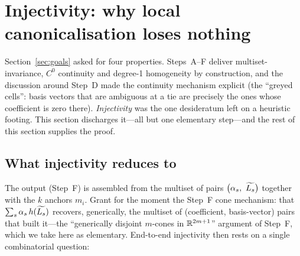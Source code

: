 %

\section{Injectivity: why local canonicalisation loses nothing}
\label{sec:bridge}

Section~\ref{sec:goals} asked for four properties.  Steps~A--F deliver
multiset-invariance, $C^0$ continuity and degree-1 homogeneity by construction,
and the discussion around Step~D made the continuity mechanism explicit (the
``greyed cells'': basis vectors that are ambiguous at a tie are precisely the
ones whose coefficient is zero there).  \emph{Injectivity} was the one
desideratum left on a heuristic footing.  This section discharges it---all but
one elementary step---and the rest of this section supplies the proof.

\subsection*{What injectivity reduces to}

The output (Step~F) is assembled from the multiset of pairs
$\bigl(\alpha_s,\ \widetilde{L_s}\bigr)$ together with the $k$ anchors $m_i$.  Grant
for the moment the Step~F cone mechanism: that $\sum_s\alpha_s\,h(\widetilde{L_s})$
recovers, generically, the multiset of (coefficient, basis-vector) pairs that
built it---the ``generically disjoint $m$-cones in $\mathbb{R}^{2m+1}$'' argument of
Step~F, which we take here as elementary.  End-to-end injectivity then rests on
a single combinatorial question:

